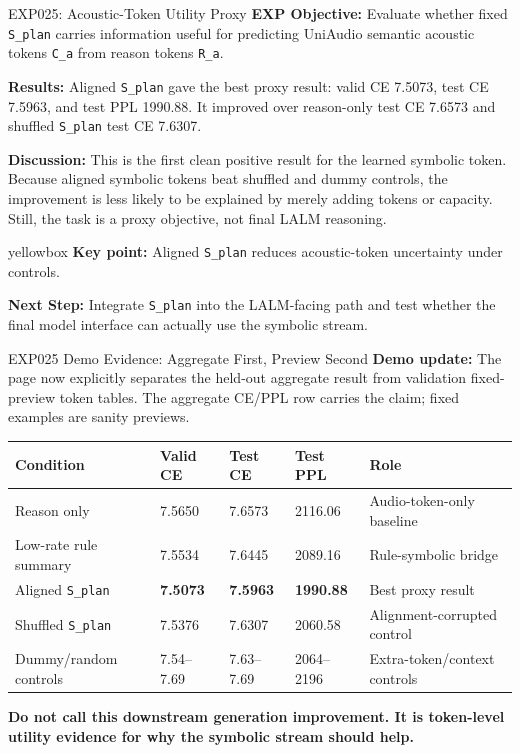 \documentclass[aspectratio=169,11pt]{beamer}
\newcommand{\missing}[1]{{\color{missingred}\textbf{#1}}}
\newcommand{\code}[1]{\texttt{\footnotesize #1}}
\newcommand{\expfield}[2]{\textbf{#1:} #2\par\vspace{0.10cm}}
\newenvironment{keybox}{%
  \begin{beamercolorbox}[rounded=true,sep=0.14cm,wd=\linewidth]{yellowbox}\footnotesize%
}{%
  \end{beamercolorbox}%
}
\begin{document}
\begin{frame}{EXP025: Acoustic-Token Utility Proxy}
  \footnotesize
  \expfield{EXP Objective}{Evaluate whether fixed \code{S\_plan} carries information useful for predicting UniAudio semantic acoustic tokens \code{C\_a} from reason tokens \code{R\_a}.}
  \expfield{Results}{Aligned \code{S\_plan} gave the best proxy result: valid CE 7.5073, test CE 7.5963, and test PPL 1990.88. It improved over reason-only test CE 7.6573 and shuffled \code{S\_plan} test CE 7.6307.}
  \expfield{Discussion}{This is the first clean positive result for the learned symbolic token. Because aligned symbolic tokens beat shuffled and dummy controls, the improvement is less likely to be explained by merely adding tokens or capacity. Still, the task is a proxy objective, not final LALM reasoning.}
  \begin{keybox}\textbf{Key point:} Aligned \code{S\_plan} reduces acoustic-token uncertainty under controls.\end{keybox}
  \vspace{0.18cm}
  \expfield{Next Step}{Integrate \code{S\_plan} into the LALM-facing path and test whether the final model interface can actually use the symbolic stream.}
\end{frame}

\begin{frame}{EXP025 Demo Evidence: Aggregate First, Preview Second}
  \footnotesize
  \expfield{Demo update}{The page now explicitly separates the held-out aggregate result from validation fixed-preview token tables. The aggregate CE/PPL row carries the claim; fixed examples are sanity previews.}

  \begin{tabularx}{\linewidth}{p{3.0cm}p{1.5cm}p{1.55cm}p{1.55cm}Y}
    \toprule
    Condition & Valid CE & Test CE & Test PPL & Role \\
    \midrule
    Reason only & 7.5650 & 7.6573 & 2116.06 & Audio-token-only baseline \\
    Low-rate rule summary & 7.5534 & 7.6445 & 2089.16 & Rule-symbolic bridge \\
    Aligned \code{S\_plan} & \textbf{7.5073} & \textbf{7.5963} & \textbf{1990.88} & Best proxy result \\
    Shuffled \code{S\_plan} & 7.5376 & 7.6307 & 2060.58 & Alignment-corrupted control \\
    Dummy/random controls & 7.54--7.69 & 7.63--7.69 & 2064--2196 & Extra-token/context controls \\
    \bottomrule
  \end{tabularx}

  \vspace{0.18cm}
  \missing{Do not call this downstream generation improvement. It is token-level utility evidence for why the symbolic stream should help.}
\end{frame}
\end{document}
